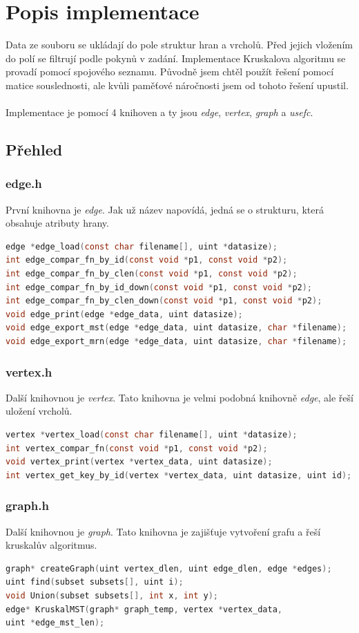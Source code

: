 \documentclass[12pt, a4paper]{report}
\begin{document}
\chapter{Popis implementace}
Data ze souboru se ukládají do pole struktur hran a vrcholů. Před jejich vložením do polí se filtrují podle pokynů v zadání. Implementace Kruskalova algoritmu se provadí pomocí spojového seznamu. Původně jsem chtěl použít řešení pomocí matice souslednosti, ale kvůli paměťové náročnosti jsem od tohoto řešení upustil.\\\\
Implementace je pomocí 4 knihoven a ty jsou \emph{edge}, \emph{vertex}, \emph{graph} a \emph{usefc}.
\section{Přehled}
%
%
\subsection{edge.h}
První knihovna je \emph{edge}. Jak už název napovídá, jedná se o strukturu, která obsahuje atributy hrany.
\begin{lstlisting}[language=C]
edge *edge_load(const char filename[], uint *datasize);
int edge_compar_fn_by_id(const void *p1, const void *p2);
int edge_compar_fn_by_clen(const void *p1, const void *p2);
int edge_compar_fn_by_id_down(const void *p1, const void *p2);
int edge_compar_fn_by_clen_down(const void *p1, const void *p2);
void edge_print(edge *edge_data, uint datasize);
void edge_export_mst(edge *edge_data, uint datasize, char *filename);
void edge_export_mrn(edge *edge_data, uint datasize, char *filename);
\end{lstlisting}
\pagebreak
%
%
\subsection{vertex.h}
Další knihovnou je \emph{vertex}. Tato knihovna je velmi podobná knihovně \emph{edge}, ale řeší uložení vrcholů.
\begin{lstlisting}[language=C]
vertex *vertex_load(const char filename[], uint *datasize);
int vertex_compar_fn(const void *p1, const void *p2);
void vertex_print(vertex *vertex_data, uint datasize);
int vertex_get_key_by_id(vertex *vertex_data, uint datasize, uint id);
\end{lstlisting}
%
%
\subsection{graph.h}
Další knihovnou je \emph{graph}. Tato knihovna je zajišťuje vytvoření grafu a řeší kruskalův algoritmus.
\begin{lstlisting}[language=C]
graph* createGraph(uint vertex_dlen, uint edge_dlen, edge *edges);
uint find(subset subsets[], uint i);
void Union(subset subsets[], int x, int y);
edge* KruskalMST(graph* graph_temp, vertex *vertex_data,
uint *edge_mst_len);
\end{lstlisting}
%
%
\end{document}
